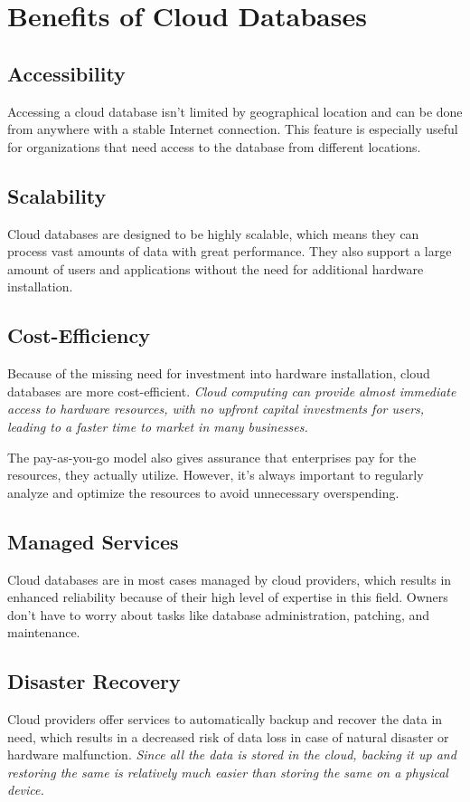 \documentclass[12pt, a4paper]{article}
\begin{document}
\section{Benefits of Cloud Databases}
    \subsection{Accessibility}
        Accessing a cloud database isn't limited by geographical location and can be done from anywhere with a stable Internet connection. This feature is especially useful for organizations that need access to the database from different locations.
    
    \subsection{Scalability}
        Cloud databases are designed to be highly scalable, which means they can process vast amounts of data with great performance. They also support a large amount of users and applications without the need for additional hardware installation.

    \subsection{Cost-Efficiency}
        Because of the missing need for investment into hardware installation, cloud databases are more cost-efficient. \textit{Cloud computing can provide almost immediate access to hardware resources, with no upfront capital investments for users, leading to a faster time to market in many businesses.}\cite{12}\par The pay-as-you-go model also gives assurance that enterprises pay for the resources, they actually utilize. However, it's always important to regularly analyze and optimize the resources to avoid unnecessary overspending.
        
    \subsection{Managed Services}
        Cloud databases are in most cases managed by cloud providers, which results in enhanced reliability because of their high level of expertise in this field. Owners don't have to worry about tasks like database administration, patching, and maintenance.
        
    \subsection{Disaster Recovery}
        Cloud providers offer services to automatically backup and recover the data in need, which results in a decreased risk of data loss in case of natural disaster or hardware malfunction. \textit{Since all the data is stored in the cloud, backing it up and restoring the same is relatively much easier than storing the same on a physical device.}\cite{13}
\clearpage
\end{document}
